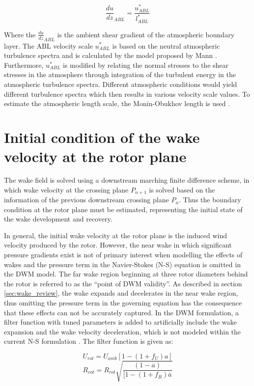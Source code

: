 \documentclass{umthesis}
\begin{document}
\begin{equation}
  \frac{du}{dz}_{ABL}=\frac{u^*_{ABL}}{l^*_{ABL}}
\end{equation}

Where the $\frac{du}{dz}_{ABL}$ is the ambient shear gradient of the atmospheric boundary layer. The ABL velocity scale $u^*_{ABL}$ is based on the neutral atmospheric turbulence spectra and is calculated by the model proposed by Mann \cite{Mann_spatial}\cite{Mann_Wind}. Furthermore, $u^*_{ABL}$ is modified by relating the normal stresses to the shear stresses in the atmosphere through integration of the turbulent energy in the atmospheric turbulence spectra. Different atmospheric conditions would yield different turbulence spectra which then results in various velocity scale values. To estimate the atmospheric length scale, the Monin-Obukhov length is used \cite{Keck_two}.


\section{Initial condition of the wake velocity at the rotor plane} \label{sec:wake_BC}
The wake field is solved using a downstream marching finite difference scheme, in which wake velocity at the crossing plane $P_{n+1}$ is solved based on the information of the previous downstream crossing plane $P_n$. Thus the boundary condition at the rotor plane must be estimated, representing the initial state of the wake development and recovery.

In general, the initial wake velocity at the rotor plane is the induced wind velocity produced by the rotor. However, the near wake in which significant pressure gradients exist is not of primary interest when modelling the effects of wakes and the pressure term in the Navier-Stokes (N-S) equation is omitted in the DWM model. The far wake region beginning at three rotor diameters behind the rotor is referred to as the “point of DWM validity”. As described in section \ref{sec:wake_review}, the wake expands and decelerates in the near wake region, thus omitting the pressure term in the governing equation has the consequence that these effects can not be accurately captured. In the DWM formulation, a filter function with tuned parameters is added to artificially include the wake expansion and the wake velocity deceleration, which is not modeled within the current N-S formulation \cite{hansen_impact_2012}. The filter function is given as:

\begin{equation}
  U_{rot}=U_{amb}[1-(1+f_U)a]
\end{equation}
\begin{equation}
  R_{rot}=R_{rot}\sqrt{\frac{(1-\overline{a})}{[1-(1+f_R)\overline{a}}}
\end{equation}
\end{document}
